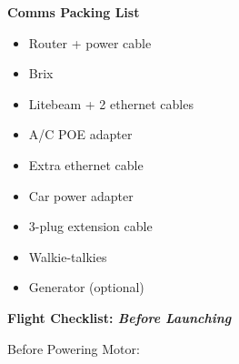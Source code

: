 \documentclass[]{auvsi_doc}
\begin{document}
\hrulefill

\textbf{Comms Packing List}
\begin{itemize}
\item Router + power cable
        \item Brix
	\item Litebeam + 2 ethernet cables
	\item A/C POE adapter
	\item Extra ethernet cable
	\item Car power adapter
	\item 3-plug extension cable
	\item Walkie-talkies
	\item Generator (optional)
\end{itemize}

\hrulefill

\textbf{Flight Checklist: \textit{Before Launching}}

Before Powering Motor:
\end{document}
